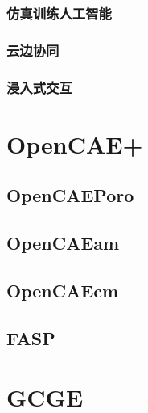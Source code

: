 \documentclass[letterpaper,10pt,english]{sphinxmanual}
\begin{document}
\subsection{仿真训练人工智能}
\label{\detokenize{src/fengsim/dt:id2}}

\subsection{云边协同}
\label{\detokenize{src/fengsim/dt:id3}}

\subsection{浸入式交互}
\label{\detokenize{src/fengsim/dt:id4}}
\sphinxstepscope


\chapter{OpenCAE+}
\label{\detokenize{src/opencaeplus/main:opencae}}\label{\detokenize{src/opencaeplus/main::doc}}
\sphinxstepscope


\section{OpenCAEPoro}
\label{\detokenize{src/opencaeplus/opencaeporo:opencaeporo}}\label{\detokenize{src/opencaeplus/opencaeporo::doc}}
\sphinxstepscope


\section{OpenCAEam}
\label{\detokenize{src/opencaeplus/opencaeam:opencaeam}}\label{\detokenize{src/opencaeplus/opencaeam::doc}}
\sphinxstepscope


\section{OpenCAEcm}
\label{\detokenize{src/opencaeplus/opencaecm:opencaecm}}\label{\detokenize{src/opencaeplus/opencaecm::doc}}
\sphinxstepscope


\section{FASP}
\label{\detokenize{src/opencaeplus/fasp:fasp}}\label{\detokenize{src/opencaeplus/fasp::doc}}
\sphinxstepscope


\chapter{GCGE}
\label{\detokenize{src/gcge/main:gcge}}\label{\detokenize{src/gcge/main::doc}}
\end{document}
